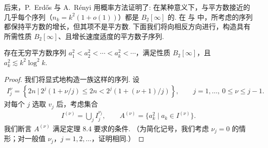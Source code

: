后来，P.~Erdős 与 A.~Rényi \cite{b185} 用概率方法证明了: 在某种意义下，与平方数接近的几乎每个序列（$n_k = k^2(1 + o(1))$）都是 $B_2[\infty]$ 的. 在 \cite{b171} 与 \cite{b185} 中，所考虑的序列都保持平方数的增长，但其项不是平方数. 下面我们将向相反方向进行，构造具有所需性质 $B_2[\infty]$、且增长速度适度的平方数子序列.

\begin{theorem}\label{thm:8.4}
存在无穷平方数序列 $a_1^2 < a_2^2 < \cdots < a_k^2 < \cdots$，满足性质 $B_2[\infty]$，且 $a_k^2 \lesssim k^2\log^2 k$.
\end{theorem}

\begin{proof}
我们将显式地构造一族这样的序列. 设
\begin{align*}
  I_{j}^{\nu}=\left\{2n\ \Big|\ 2^{j}(1+\nu/j)\leq 2n<2^{j}(1+(\nu+1)/j)\right\},\qquad j=1,\ldots,\ 0\leq\nu\leq j-1.
\end{align*}
对每个 $j$ 选取 $v_{j}$ 后，考虑集合
\begin{align*}
  I^{(\nu)}=\bigcup_{j}I_{j}^{\nu_{j}},\qquad
  A^{(\nu)}=\{a_{k}^{2}\mid a_{k}\in I^{(\nu)}\}.
\end{align*}
我们断言 $A^{(\nu)}$ 满足定理 8.4 要求的条件. （为简化记号，我们考虑 $\nu_j = 0$ 的情形；对一般值 $\nu_j$，$j = 1, 2, \ldots$，证明相同.）


\end{proof}
